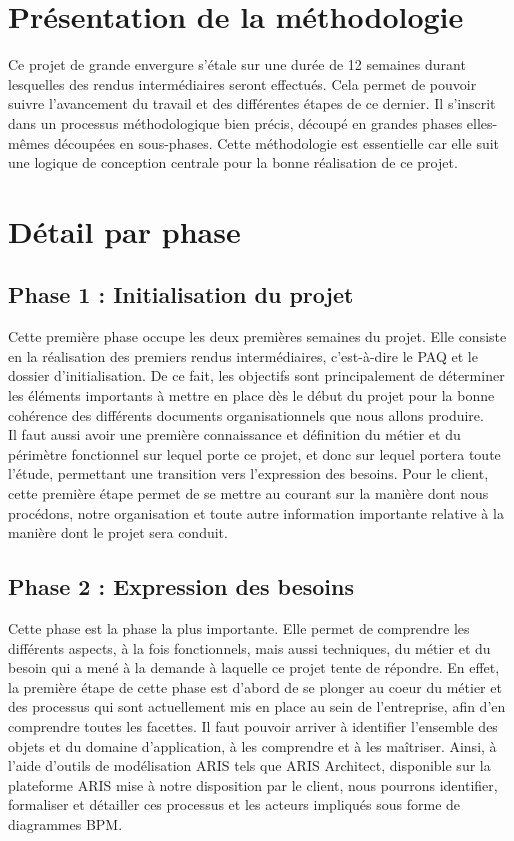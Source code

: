 
\section{Présentation de la méthodologie}

Ce projet de grande envergure s’étale sur une durée de 12 semaines durant lesquelles des rendus intermédiaires seront effectués. Cela permet de pouvoir suivre l’avancement du travail et des différentes étapes de ce dernier. Il s’inscrit dans un processus méthodologique bien précis, découpé en grandes phases elles-mêmes découpées en sous-phases. Cette méthodologie est essentielle car elle suit une logique de conception centrale pour la bonne réalisation de ce projet.

\section{Détail par phase}

\subsection{Phase 1 : Initialisation du projet}

Cette première phase occupe les deux premières semaines du projet. Elle consiste en la réalisation des premiers rendus intermédiaires, c’est-à-dire le PAQ et le dossier d’initialisation. De ce fait, les objectifs sont principalement de déterminer les éléments importants à mettre en place dès le début du projet pour la bonne cohérence des différents documents organisationnels que nous allons produire. \\

Il faut aussi avoir une première connaissance et définition du métier et du périmètre fonctionnel sur lequel porte ce projet, et donc sur lequel portera toute l’étude, permettant une transition vers l’expression des besoins. Pour le client, cette première étape permet de se mettre au courant sur la manière dont nous procédons, notre organisation et toute autre information importante relative à la manière dont le projet sera conduit.

\subsection{Phase 2 : Expression des besoins}

Cette phase est la phase la plus importante. Elle permet de comprendre les différents aspects, à la fois fonctionnels, mais aussi techniques, du métier et du besoin qui a mené à la demande à laquelle ce projet tente de répondre. En effet, la première étape de cette phase est d’abord de se plonger au coeur du métier et des processus qui sont actuellement mis en place au sein de l’entreprise, afin d’en comprendre toutes les facettes. Il faut pouvoir arriver à identifier l’ensemble des objets et du domaine d’application, à les comprendre et à les maîtriser. Ainsi, à l’aide d’outils de modélisation ARIS tels que ARIS Architect, disponible sur la plateforme ARIS mise à notre disposition par le client, nous pourrons identifier, formaliser et détailler ces processus et les acteurs impliqués sous forme de diagrammes BPM. \\

